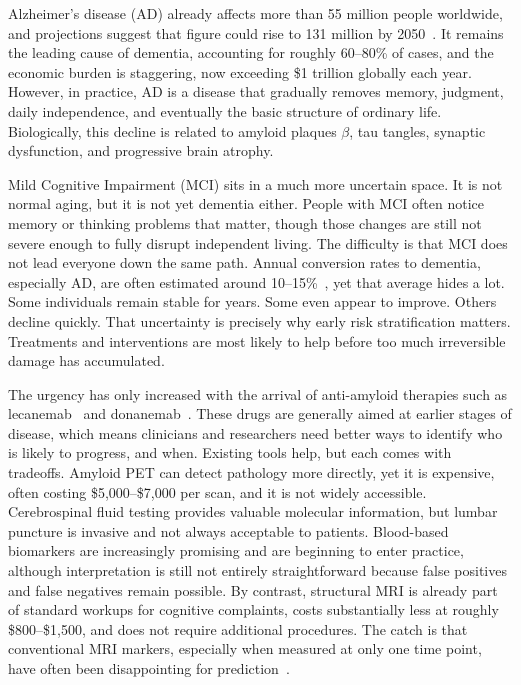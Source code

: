 \documentclass[blue]{ludusofficial}
\begin{document}
Alzheimer's disease (AD) already affects more than 55 million people worldwide, and projections suggest that figure could rise to 131 million by 2050~\cite{hafeez2024deep}. It remains the leading cause of dementia, accounting for roughly 60--80\% of cases, and the economic burden is staggering, now exceeding \$1 trillion globally each year. However, in practice, AD is a disease that gradually removes memory, judgment, daily independence, and eventually the basic structure of ordinary life. Biologically, this decline is related to amyloid plaques $\beta$, tau tangles, synaptic dysfunction, and progressive brain atrophy.

Mild Cognitive Impairment (MCI) sits in a much more uncertain space. It is not normal aging, but it is not yet dementia either. People with MCI often notice memory or thinking problems that matter, though those changes are still not severe enough to fully disrupt independent living. The difficulty is that MCI does not lead everyone down the same path. Annual conversion rates to dementia, especially AD, are often estimated around 10--15\%~\cite{li2021predicting}, yet that average hides a lot. Some individuals remain stable for years. Some even appear to improve. Others decline quickly. That uncertainty is precisely why early risk stratification matters. Treatments and interventions are most likely to help before too much irreversible damage has accumulated.

The urgency has only increased with the arrival of anti-amyloid therapies such as lecanemab~\cite{vanDyck2022lecanemab} and donanemab~\cite{sims2023donanemab}. These drugs are generally aimed at earlier stages of disease, which means clinicians and researchers need better ways to identify who is likely to progress, and when. Existing tools help, but each comes with tradeoffs. Amyloid PET can detect pathology more directly, yet it is expensive, often costing \$5,000--\$7,000 per scan, and it is not widely accessible. Cerebrospinal fluid testing provides valuable molecular information, but lumbar puncture is invasive and not always acceptable to patients. Blood-based biomarkers are increasingly promising and are beginning to enter practice, although interpretation is still not entirely straightforward because false positives and false negatives remain possible. By contrast, structural MRI is already part of standard workups for cognitive complaints, costs substantially less at roughly \$800--\$1,500, and does not require additional procedures. The catch is that conventional MRI markers, especially when measured at only one time point, have often been disappointing for prediction~\cite{baytas2024predicting}.
\end{document}
